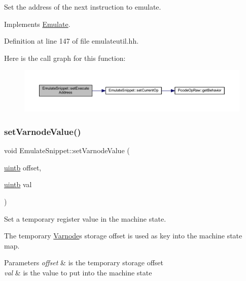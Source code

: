 Set the address of the next instruction to emulate. 



Implements \mbox{\hyperlink{class_emulate_aff5f9779fdad54f853d4e799f5289410}{Emulate}}.



Definition at line 147 of file emulateutil.\+hh.

Here is the call graph for this function\+:
\nopagebreak
\begin{figure}[H]
\begin{center}
\leavevmode
\includegraphics[width=350pt]{class_emulate_snippet_a22a13101a25f73f33a9b10f20ebf018a_cgraph}
\end{center}
\end{figure}
\mbox{\label{class_emulate_snippet_abc4c1bf018f8ab3c0cea77fa927f5968}} 
\subsubsection{\texorpdfstring{setVarnodeValue()}{setVarnodeValue()}}
{\footnotesize\ttfamily void Emulate\+Snippet\+::set\+Varnode\+Value (\begin{DoxyParamCaption}\item[{\mbox{\hyperlink{types_8h_a2db313c5d32a12b01d26ac9b3bca178f}{uintb}}}]{offset,  }\item[{\mbox{\hyperlink{types_8h_a2db313c5d32a12b01d26ac9b3bca178f}{uintb}}}]{val }\end{DoxyParamCaption})\hspace{0.3cm}{\ttfamily [inline]}}



Set a temporary register value in the machine state. 

The temporary \mbox{\hyperlink{class_varnode}{Varnode}}\textquotesingle{}s storage offset is used as key into the machine state map. 
\begin{DoxyParams}{Parameters}
{\em offset} & is the temporary storage offset \\
\hline
{\em val} & is the value to put into the machine state \\
\hline
\end{DoxyParams}



